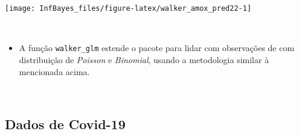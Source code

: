 \documentclass[
]{book}
\providecommand{\tightlist}{%
  \setlength{\itemsep}{0pt}\setlength{\parskip}{0pt}}
\begin{document}
\begin{center}\texttt{[image: InfBayes\_files/figure-latex/walker\_amox\_pred22-1]} \end{center}

\(~\)

\begin{itemize}
\tightlist
\item
  A função \texttt{walker\_glm} estende o pacote para lidar com observações de com distribuição de \emph{Poisson} e \emph{Binomial}, usando a metodologia similar à mencionada acima.
\end{itemize}

\(~\)

\hypertarget{dados-de-covid-19}{%
\subsection{Dados de Covid-19}\label{dados-de-covid-19}}
\end{document}
